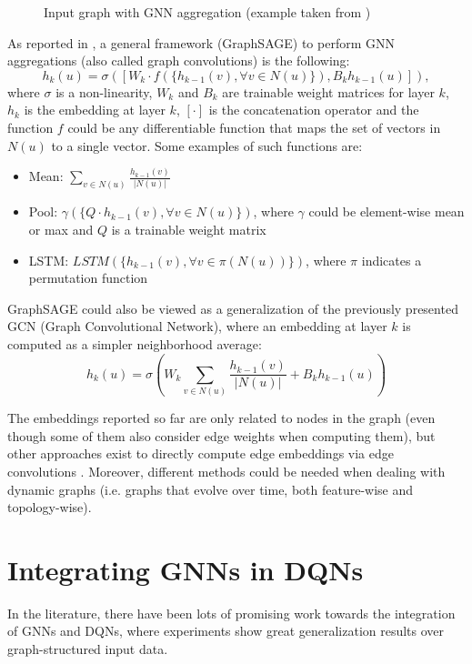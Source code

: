 \documentclass[a4paper,10pt]{report}
\begin{document}
\begin{figure}[!h]
	\caption{Input graph with GNN aggregation (example taken from \cite{gnn-lectures})}
	\label{fig:gnn-drawing}
\end{figure}
\clearpage

As reported in \cite{graphsage}, a general framework (GraphSAGE) to perform GNN aggregations (also called graph convolutions) is the following:
$$
h_k(u)=\sigma\left(\left[W_k \cdot f(\{h_{k-1}(v), \forall v \in N(u)\}), B_k h_{k-1}(u)\right]\right),
$$
where $\sigma$ is a non-linearity, $W_k$ and $B_k$ are trainable weight matrices for layer $k$, $h_k$ is the embedding at layer $k$, $[\cdot]$ is the concatenation operator and the function $f$ could be any differentiable function that maps the set of vectors in $N(u)$ to a single vector. Some examples of such functions are:
\begin{itemize}
	\item Mean: $\sum_{v\in N(u)}\frac{h_{k-1}(v)}{|N(u)|}$
	\item Pool: $\gamma(\{Q\cdot h_{k-1}(v), \forall v \in N(u)\})$, where $\gamma$ could be element-wise mean or max and $Q$ is a trainable weight matrix
	\item LSTM: $LSTM(\{h_{k-1}(v), \forall v \in \pi(N(u))\})$, where $\pi$ indicates a permutation function 
\end{itemize}

GraphSAGE could also be viewed as a generalization of the previously presented GCN \cite{gcn} (Graph Convolutional Network), where an embedding at layer $k$ is computed as a simpler neighborhood average:
$$
h_k(u)=\sigma\left(W_k\sum_{v\in N(u)}\frac{h_{k-1}(v)}{|N(u)|}+B_k h_{k-1}(u)\right)
$$

The embeddings reported so far are only related to nodes in the graph (even though some of them also consider edge weights when computing them), but other approaches exist to directly compute edge embeddings via edge convolutions \cite{edge-conv-gnn}. Moreover, different methods could be needed when dealing with dynamic graphs (i.e. graphs that evolve over time, both feature-wise and topology-wise).


\section{Integrating GNNs in DQNs}
In the literature, there have been lots of promising work towards the integration of GNNs and DQNs, where experiments show great generalization results over graph-structured input data.
\end{document}
